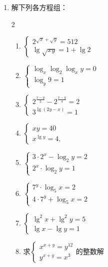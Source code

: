 \begin{enumerate}
\item 解下列各方程组：
\begin{multicols}{2}
\begin{enumerate}
  \item  $\begin{cases}2^{\sqrt{{x}}+\sqrt{y}}=512 \\ \lg \sqrt{x y}=1+\lg 2\end{cases}$
\item  $\begin{cases}\log _{x} \log _{2} \log _{x} y=0 \\ \log _{y} 9=1\end{cases}$
\item  $\begin{cases}2^{\tfrac{x-y}{2}}-2^{\tfrac{x-y}{4}}=2 \\ 3^{\lg(2 y-x)}=1\end{cases}$
\item $\begin{cases}x y=40 \\ x^{\lg y}=4,\end{cases}$
\item  $\begin{cases}3\cdot 2^{x}-\log _{2} y=2 \\ 2^{x} \cdot \log _{2} y=1\end{cases}$
\item  $\begin{cases}7^{y} \cdot \log _{5} x=2 \\ 4\cdot 7^{y}+\log _{5} x=2\end{cases}$
\item $\begin{cases}
\lg^2x+\lg^2y=5\\
\lg x-\lg y=1
\end{cases}$
\item 求$\begin{cases}
x^{x+y}=y^{12}\\
y^{x+y}=x^3
\end{cases}$的整数解
\end{enumerate}
\end{multicols}


\end{enumerate}
